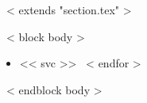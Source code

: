 ~< extends "section.tex" >~

~< block body >~
\begin{itemize}
  ~< for svc in items >~
    \item << svc >> 
  ~< endfor >~
\end{itemize}
~< endblock body >~
